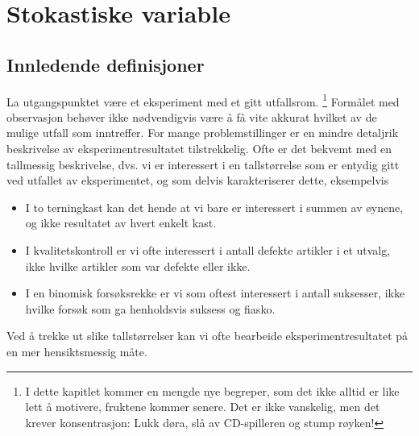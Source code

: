 \chapter{Stokastiske variable}
\label{kap:stokastiske} %

\section{Innledende definisjoner}

La utgangspunktet være et eksperiment med et gitt utfallsrom.
\footnote{I dette kapitlet kommer en mengde nye begreper, som det ikke
alltid er like lett å motivere, fruktene kommer senere.
Det er ikke vanskelig, men det krever konsentrasjon: Lukk døra, slå av
CD-spilleren og stump røyken!}
Formålet med observasjon  behøver ikke nødvendigvis være å
få vite akkurat hvilket av de mulige utfall som inntreffer.
For mange problemstillinger er en mindre
detaljrik beskrivelse av eksperiment\-resultatet tilstrekkelig.
Ofte er det bekvemt med en tallmessig beskri\-velse, dvs. vi er
interessert i en tallstørrelse som er entydig gitt ved utfallet
av eksperimentet, og som delvis karakteriserer dette, eksempelvis

\begin{itemize}
\item  I to terningkast kan det hende at vi bare er interessert i
   summen av øynene, og ikke resultatet av hvert enkelt kast.
\item  I kvalitetskontroll er vi ofte interessert i antall defekte
   artikler i et utvalg, ikke hvilke artikler som var defekte
   eller ikke.
\item  I en binomisk forsøksrekke er vi som oftest interessert i
   antall suksesser, ikke hvilke forsøk som ga henholdsvis
   suksess og fiasko.
\end{itemize}

\noindent Ved å trekke ut slike tallstørrelser kan vi ofte bearbeide
eksperimentresultatet på en mer hensiktsmessig måte.

\begin{center}  \end{center}

